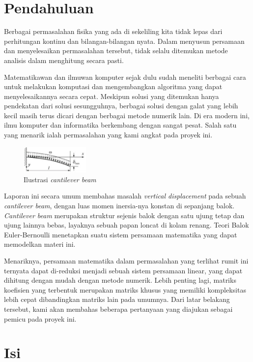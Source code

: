 \documentclass[10pt, a4paper, onecolumn, oneside, final]{report}
\begin{document}
\section*{Pendahuluan}

Berbagai permasalahan fisika yang ada di sekeliling kita tidak lepas dari perhitungan kontinu dan bilangan-bilangan nyata. Dalam menyusun persamaan dan menyelesaikan permasalahan tersebut, tidak selalu ditemukan metode analisis dalam menghitung secara pasti.

Matematikawan dan ilmuwan komputer sejak dulu sudah meneliti berbagai cara untuk melakukan komputasi dan mengembangkan algoritma yang dapat menyelesaikannya secara cepat. Meskipun solusi yang ditemukan hanya pendekatan dari solusi sesungguhnya, berbagai solusi dengan galat yang lebih kecil masih terus dicari dengan berbagai metode numerik lain. Di era modern ini, ilmu komputer dan informatika berkembang dengan sangat pesat. Salah satu yang menarik ialah permasalahan yang kami angkat pada proyek ini.

\begin{figure}[h]
  \centering
    \includegraphics[width=0.3\textwidth]{assets/beam.png}
  \caption{Ilustrasi \textit{cantilever beam}}
\end{figure}

Laporan ini secara umum membahas masalah \textit{vertical displacement} pada sebuah \textit{cantilever beam}, dengan luas momen inersia-nya konstan di sepanjang balok. \textit{Cantilever beam} merupakan struktur sejenis balok dengan satu ujung tetap dan ujung lainnya bebas, layaknya sebuah papan loncat di kolam renang. Teori Balok Euler-Bernoulli menetapkan suatu sistem persamaan matematika yang dapat memodelkan materi ini.

Menariknya, persamaan matematika dalam permasalahan yang terlihat rumit ini ternyata dapat di-reduksi menjadi sebuah sistem persamaan linear, yang dapat dihitung dengan mudah dengan metode numerik. Lebih penting lagi, matriks koefisien yang terbentuk merupakan matriks khusus yang memiliki kompleksitas lebih cepat dibandingkan matriks lain pada umumnya. Dari latar belakang tersebut, kami akan membahas beberapa pertanyaan yang diajukan sebagai pemicu pada proyek ini.

\section*{Isi}
\end{document}
